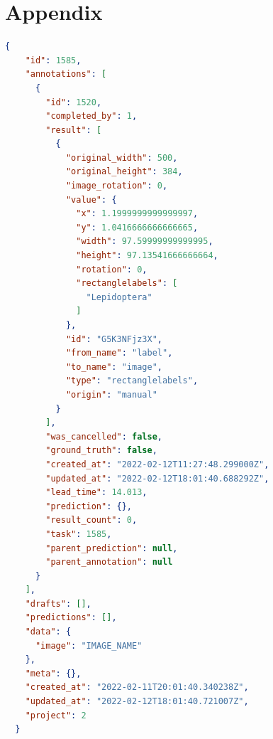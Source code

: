 \section{Appendix}\label{sec:appendix}
\begin{lstlisting}[language=json, caption={LabelStudio JSON format.}, label={A1}, captionpos=b, basicstyle=\footnotesize]
{
    "id": 1585,
    "annotations": [
      {
        "id": 1520,
        "completed_by": 1,
        "result": [
          {
            "original_width": 500,
            "original_height": 384,
            "image_rotation": 0,
            "value": {
              "x": 1.1999999999999997,
              "y": 1.0416666666666665,
              "width": 97.59999999999995,
              "height": 97.13541666666664,
              "rotation": 0,
              "rectanglelabels": [
                "Lepidoptera"
              ]
            },
            "id": "G5K3NFjz3X",
            "from_name": "label",
            "to_name": "image",
            "type": "rectanglelabels",
            "origin": "manual"
          }
        ],
        "was_cancelled": false,
        "ground_truth": false,
        "created_at": "2022-02-12T11:27:48.299000Z",
        "updated_at": "2022-02-12T18:01:40.688292Z",
        "lead_time": 14.013,
        "prediction": {},
        "result_count": 0,
        "task": 1585,
        "parent_prediction": null,
        "parent_annotation": null
      }
    ],
    "drafts": [],
    "predictions": [],
    "data": {
      "image": "IMAGE_NAME"
    },
    "meta": {},
    "created_at": "2022-02-11T20:01:40.340238Z",
    "updated_at": "2022-02-12T18:01:40.721007Z",
    "project": 2
  }
\end{lstlisting}


